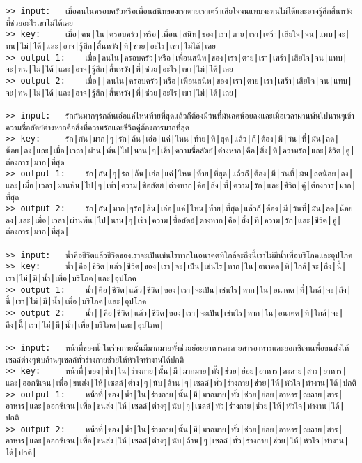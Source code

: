 \documentclass[11pt]{article}
\begin{document}
\begin{Verbatim}[commandchars=\\\{\}]
>> input:	เมื่อคนในครอบครัวหรือเพื่อนสนิทของเราตายเราเศร้าเสียใจจนแทบจะทนไม่ได้และอาจรู้สึกสิ้นหวังที่ช่วยอะไรเขาไม่ได้เลย
>> key:		เมื่อ|คน|ใน|ครอบครัว|หรือ|เพื่อน|สนิท|ของ|เรา|ตาย|เรา|เศร้า|เสียใจ|จน|แทบ|จะ|ทน|ไม่|ได้|และ|อาจ|รู้สึก|สิ้นหวัง|ที่|ช่วย|อะไร|เขา|ไม่ได้|เลย
>> output 1:	เมื่อ|คนใน|ครอบครัว|หรือ|เพื่อนสนิท|ของ|เรา|ตาย|เรา|เศร้า|เสียใจ|จน|แทบ|จะ|ทน|ไม่|ได้|และ|อาจ|รู้สึก|สิ้นหวัง|ที่|ช่วย|อะไร|เขา|ไม่|ได้|เลย
>> output 2:	เมื่อ||คนใน|ครอบครัว|หรือ|เพื่อนสนิท|ของ|เรา|ตาย|เรา|เศร้า|เสียใจ|จน|แทบ|จะ|ทน|ไม่|ได้|และ|อาจ|รู้สึก|สิ้นหวัง|ที่|ช่วย|อะไร|เขา|ไม่|ได้|เลย|

>> input:	รักกันมากๆรักล้นเอ่อแค่ไหนท้ายที่สุดแล้วก็ต้องมีวันที่มันลดน้อยลงและเมื่อเวลาผ่านพ้นไปนานๆเข้าความซื่อสัตย์ต่างหากคือสิ่งที่ความรักและชีวิตคู่ต้องการมากที่สุด
>> key:		รัก|กัน|มาก|ๆ|รัก|ล้น|เอ่อ|แค่|ไหน|ท้าย|ที่|สุด|แล้ว|ก็|ต้อง|มี|วัน|ที่|มัน|ลด|น้อย|ลง|และ|เมื่อ|เวลา|ผ่าน|พ้น|ไป|นาน|ๆ|เข้า|ความซื่อสัตย์|ต่างหาก|คือ|สิ่ง|ที่|ความรัก|และ|ชีวิต|คู่|ต้องการ|มาก|ที่สุด
>> output 1:	รัก|กัน|ๆ|รัก|ล้น|เอ่อ|แค่|ไหน|ท้าย|ที่สุด|แล้วก็|ต้อง|มี|วันที่|มัน|ลดน้อย|ลง|และ|เมื่อ|เวลา|ผ่านพ้น|ไป|ๆ|เข้า|ความ|ซื่อสัตย์|ต่างหาก|คือ|สิ่ง|ที่|ความ|รัก|และ|ชีวิต|คู่|ต้องการ|มาก|ที่สุด
>> output 2:	รัก|กัน|มาก|ๆรัก|ล้น|เอ่อ|แค่|ไหน|ท้าย|ที่สุด|แล้วก็|ต้อง|มี|วันที่|มัน|ลด|น้อยลง|และ|เมื่อ|เวลา|ผ่านพ้น|ไป|นาน|ๆ|เข้า|ความ|ซื่อสัตย์|ต่างหาก|คือ|สิ่ง|ที่|ความ|รัก|และ|ชีวิต|คู่|ต้องการ|มาก|ที่สุด|

>> input:	น้ำคือชีวิตแล้วชีวิตของเราจะเป็นเช่นไรหากในอนาคตที่ใกล้จะถึงนี้เราไม่มีน้ำเพื่อบริโภคและอุปโภค
>> key:		น้ำ|คือ|ชีวิต|แล้ว|ชีวิต|ของ|เรา|จะ|เป็น|เช่นไร|หาก|ใน|อนาคต|ที่|ใกล้|จะ|ถึง|นี้|เรา|ไม่|มี|น้ำ|เพื่อ|บริโภค|และ|อุปโภค
>> output 1:	น้ำ|คือ|ชีวิต|แล้ว|ชีวิต|ของ|เรา|จะเป็น|เช่นไร|หาก|ใน|อนาคต|ที่|ใกล้|จะ|ถึง|นี้|เรา|ไม่|มี|น้ำ|เพื่อ|บริโภค|และ|อุปโภค
>> output 2:	น้ำ||คือ|ชีวิต|แล้ว|ชีวิต|ของ|เรา|จะเป็น|เช่นไร|หาก|ใน|อนาคต|ที่|ใกล้|จะ|ถึง|นี้|เรา|ไม่|มี|น้ำ|เพื่อ|บริโภค|และ|อุปโภค|

>> input:	หน้าที่ของน้ำในร่างกายนั้นมีมากมายทั้งช่วยย่อยอาหารละลายสารอาหารและออกซิเจนเพื่อขนส่งให้เซลล์ต่างๆนับล้านๆเซลล์ทั่วร่างกายช่วยให้หัวใจทำงานได้ปกติ
>> key:		หน้าที่|ของ|น้ำ|ใน|ร่างกาย|นั้น|มี|มากมาย|ทั้ง|ช่วย|ย่อย|อาหาร|ละลาย|สาร|อาหาร|และ|ออกซิเจน|เพื่อ|ขนส่ง|ให้|เซลล์|ต่าง|ๆ|นับ|ล้าน|ๆ|เซลล์|ทั่ว|ร่างกาย|ช่วย|ให้|หัวใจ|ทำงาน|ได้|ปกติ
>> output 1:	หน้าที่|ของ|น้ำ|ใน|ร่างกาย|นั้น|มี|มากมาย|ทั้ง|ช่วย|ย่อย|อาหาร|ละลาย|สาร|อาหาร|และ|ออกซิเจน|เพื่อ|ขนส่ง|ให้|เซลล์|ต่างๆ|นับ|ๆ|เซลล์|ทั่ว|ร่างกาย|ช่วย|ให้|หัวใจ|ทำงาน|ได้|ปกติ
>> output 2:	หน้าที่|ของ|น้ำ|ใน|ร่างกาย|นั้น|มี|มากมาย|ทั้ง|ช่วย|ย่อย|อาหาร|ละลาย|สาร|อาหาร|และ|ออกซิเจน|เพื่อ|ขนส่ง|ให้|เซลล์|ต่างๆ|นับ|ล้าน|ๆ|เซลล์|ทั่ว|ร่างกาย|ช่วย|ให้|หัวใจ|ทำงาน|ได้|ปกติ|


\end{Verbatim}
\end{document}
